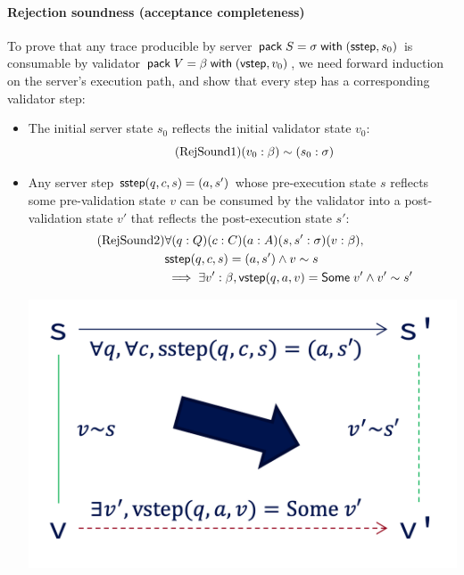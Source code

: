 \paragraph{Rejection soundness (acceptance completeness)}
To prove that any trace producible by server $\mathsf{pack}\;S=\sigma\;\mathsf{with}\;(\mathsf{sstep},s_0)$
is consumable by validator $\mathsf{pack}\;V=\beta\;\mathsf{with}\;(\mathsf{vstep},v_0)$, we need forward
induction on the server's execution path, and show that every step has a
corresponding validator step:
\begin{itemize}
\item The initial server state $s_0$ reflects the initial validator state $v_0$:
  \begin{equation}
    \tag{RejSound1}
    \label{eq:rs1}
    (v_0:\beta)\sim (s_0:\sigma)
  \end{equation}
\item Any server step $\mathsf{sstep}(q,c,s)=(a,s')$ whose pre-execution state $s$
  reflects some pre-validation state $v$ can be consumed by the validator
  into a post-validation state $v'$ that reflects the post-execution state $s'$:
  \begin{align*}
    \tag{RejSound2}
    \label{eq:rs2}
    &\forall(q:Q)(c:C)(a:A)(s,s':\sigma)(v:\beta),\\
    &\mathsf{sstep}(q,c,s)=(a,s')\wedge v\sim s\\
    &\implies\exists v':\beta,\mathsf{vstep}(q,a,v)=\mathsf{Some}\;v'\wedge v'\sim s'
  \end{align*}
  \begin{center}
    \includegraphics[width=.5\textwidth]{figures/sound}
  \end{center}
\end{itemize}

